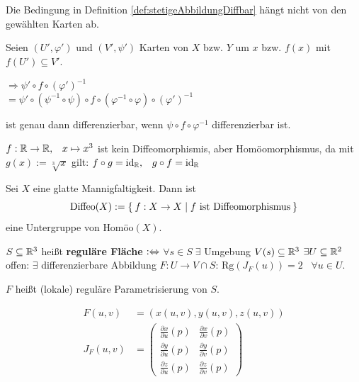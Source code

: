 \begin{korollar}
    Die Bedingung in Definition \ref{def:stetigeAbbildungDiffbar} hängt nicht
    von den gewählten Karten ab.
\end{korollar}

\begin{beweis}
    Seien $(U', \varphi')$ und $(V', \psi')$ Karten von $X$ bzw. $Y$
    um $x$ bzw. $f(x)$ mit $f(U') \subseteq V'$.
    
    $\Rightarrow \psi' \circ f \circ (\varphi')^{-1}$\\
    $= \psi' \circ ( \psi^{-1} \circ \psi) \circ f \circ (\varphi^{-1} \circ \varphi ) \circ (\varphi')^{-1}$

    ist genau dann differenzierbar, wenn $\psi \circ f \circ \varphi^{-1}$
    differenzierbar ist.
\end{beweis}

\begin{beispiel}
    $f: \mathbb{R} \rightarrow \mathbb{R}, \;\;\; x \mapsto x^3$ ist kein
    Diffeomorphismis, aber Homöomorphismus, da mit $g(x) := \sqrt[3]{x}$
    gilt: $f \circ g = \text{id}_{\mathbb{R}}, \;\;\; g \circ f = \text{id}_\text{\ensuremath{\mathbb{R}}}$
\end{beispiel}

\begin{bemerkung}
    Sei $X$ eine glatte Mannigfaltigkeit. Dann ist
    \[\text{Diffeo}(X) := \Set{f:X \rightarrow X | f \text{ ist Diffeomorphismus}}\]
    eine Untergruppe von $\text{Homöo}(X)$.
\end{bemerkung}

\begin{definition}
    $S \subseteq \mathbb{R}^3$ heißt \textbf{reguläre Fläche} $:\Leftrightarrow$
    $\forall s \in S\;\exists $ Umgebung $V(s) \subseteq \mathbb{R}^3$ $\exists U \subseteq \mathbb{R}^2$ offen: $\exists$ differenzierbare Abbildung
    $F: U \rightarrow V \cap S$: $\text{Rg}(J_F(u)) = 2\;\;\;\forall u \in U$.

    $F$ heißt (lokale) reguläre Parametrisierung von $S$.

    \begin{align*}
        F(u,v) &= \left (x(u,v), y(u,v), z(u,v) \right )\\
        J_F(u,v) &= \begin{pmatrix}
            \frac{\partial x}{\partial u} (p) & \frac{\partial x}{\partial v} (p)\\
            \frac{\partial y}{\partial u} (p) & \frac{\partial y}{\partial v} (p)\\
            \frac{\partial z}{\partial u} (p) & \frac{\partial z}{\partial v} (p)
        \end{pmatrix}
    \end{align*}
\end{definition}

